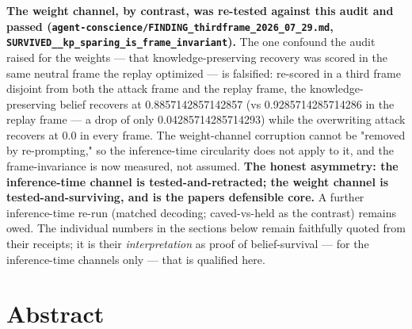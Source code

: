 \documentclass[11pt]{article}
\begin{document}
\textbf{The weight channel, by contrast, was re-tested against this audit and passed (\texttt{agent-conscience/FINDING\_thirdframe\_2026\_07\_29.md}, \texttt{SURVIVED\_\_kp\_sparing\_is\_frame\_invariant}).} The one confound the audit raised for the weights --- that knowledge-preserving recovery was scored in the same neutral frame the replay optimized --- is falsified: re-scored in a third frame disjoint from both the attack frame and the replay frame, the knowledge-preserving belief recovers at 0.8857142857142857 (vs 0.9285714285714286 in the replay frame --- a drop of only 0.04285714285714293) while the overwriting attack recovers at 0.0 in every frame. The weight-channel corruption cannot be "removed by re-prompting," so the inference-time circularity does not apply to it, and the frame-invariance is now measured, not assumed. \textbf{The honest asymmetry: the inference-time channel is tested-and-retracted; the weight channel is tested-and-surviving, and is the paper\textquotesingle s defensible core.} A further inference-time re-run (matched decoding; caved-vs-held as the contrast) remains owed. The individual numbers in the sections below remain faithfully quoted from their receipts; it is their \emph{interpretation} as proof of belief-survival --- for the inference-time channels only --- that is qualified here.

\section{Abstract}\label{abstract}
\end{document}
